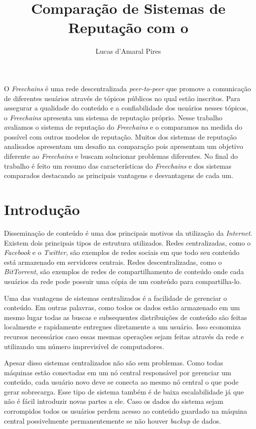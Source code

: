\documentclass[12pt]{article}
\title{Comparação de Sistemas de Reputação com o \FC}
\author{Lucas d'Amaral Pires\inst{1}}
\newcommand{\FC} {\emph{Freechains}\xspace}
\newcommand{\PtoP} {\emph{peer-to-peer}\xspace}
\begin{document}
 

\maketitle

\begin{resumo} 

O \FC é uma rede descentralizada \PtoP que promove a comunicação de diferentes usuários através de tópicos públicos no qual estão inscritos. 
Para assegurar a qualidade do conteúdo e a confiabilidade dos usuários nesses tópicos, o \FC apresenta um sistema de reputação próprio.
Nesse trabalho avaliamos o sistema de reputação do \FC e o comparamos na medida do possível com outros modelos de reputação.
Muitos dos sistemas de reputação analisados apresentam um desafio na comparação pois apresentam um objetivo diferente ao \FC e buscam solucionar problemas diferentes.
No final do trabalho é feito um resumo das características do \FC e dos sistemas comparados destacando as principais vantagens e desvantagens de cada um.
  
\end{resumo}


\section{Introdução} \label{sec:intro}

Disseminação de conteúdo é uma dos principais motivos da utilização da \emph{Internet}. 
Existem dois principais tipos de estrutura utilizados.  
Redes centralizadas, como o \emph{Facebook} e o \emph{Twitter}, são exemplos de redes sociais em que todo seu conteúdo está armazenado em servidores centrais.  
Redes descentralizadas, como o \emph{BitTorrent}, são exemplos de redes de compartilhamento de conteúdo onde cada usuários da rede pode possuir uma cópia de um conteúdo para compartilha-lo. 

Uma das vantagens de sistemas centralizados é a facilidade de gerenciar o conteúdo.  
Em outras palavras, como todos os dados estão armazenado em um mesmo lugar todas as buscas e subsequentes distribuições de conteúdo são feitas localmente e rapidamente entregues diretamente a um usuário.
Isso economiza recursos necessários caso essas mesmas operações sejam feitas através da rede e utilizando um número imprevisível de computadores.

Apesar disso sistemas centralizados não são sem problemas. 
Como todas máquinas estão conectadas em um nó central responsável por gerenciar um conteúdo, cada usuário novo deve se conecta ao mesmo nó central o que pode gerar sobrecarga. 
Esse tipo de sistema também é de baixa escalabilidade já que não é fácil introduzir novas partes a ele. 
Caso os dados do sistema sejam corrompidos todos os usuários perdem acesso ao conteúdo guardado na máquina central possivelmente permanentemente se não houver \emph{backup} de dados.
\end{document}

